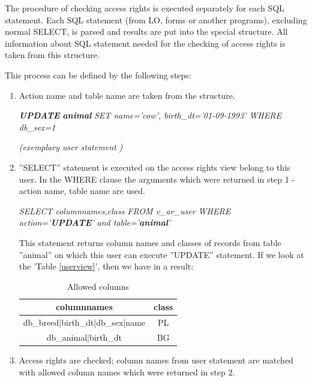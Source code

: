 The procedure of checking access rights is executed separately for each SQL statement. Each SQL statement (from LO, forms or another programs), excluding normal SELECT, is parsed and results are put into the special structure. All information about SQL statement needed for the checking of access rights is taken from this structure.

This process can be defined by the following steps: 

\begin{enumerate}
\item Action name and table name are taken from the structure.


\begin{center}\textbf{\emph{UPDATE}} \emph{}\textbf{\emph{animal}}
\emph{SET name='cow', birth\_dt='01-09-1993' WHERE db\_sex=1 }\end{center}

\begin{center}\emph{(exemplary user statement )}\end{center}

\item ''SELECT'' statement is executed on the access rights view belong to this
user. In the WHERE clause the arguments which were returned in step 1 -
action name, table name are used.
\begin{center}\emph{SELECT columnnames,class FROM v\_ar\_user WHERE
action='}\textbf{\emph{UPDATE}}\emph{' and table='}\textbf{\emph{animal}}\emph{'}\end{center}
This statement returns column names and classes of records from table
''animal'' on which this user can execute ''UPDATE'' statement.
If we look at the 'Table \ref{userview}', then we have in a result: 	

\begin{table}[h]
\begin{center}\begin{tabular}{|c|c|}
\hline 
columnnames&
class\tabularnewline
\hline
\hline 
db\_breed|birth\_dt|db\_sex|name&
PL\tabularnewline
\hline
db\_animal|birth\_dt&
BG\tabularnewline
\hline
\end{tabular}\end{center}
\caption{Allowed columns}\label{allowcolumns}
\end{table}

\item Access rights are checked; column names from user statement are matched
with allowed column names which were returned in step 2. 



\end{enumerate}
